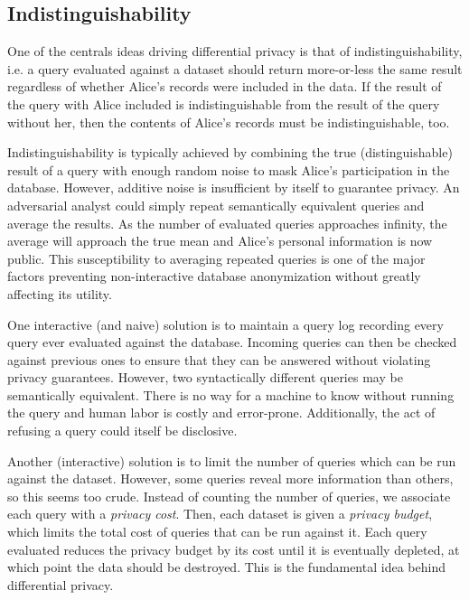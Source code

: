\documentclass[12pt]{report}
\begin{document}
\subsection{Indistinguishability}\label{subsec:intro-indistinguishability}

One of the centrals ideas driving differential privacy is that of indistinguishability, i.e. a query evaluated against a dataset should return more-or-less the same result regardless of whether Alice's records were included in the data.
If the result of the query with Alice included is indistinguishable from the result of the query without her, then the contents of Alice's records must be indistinguishable, too.

Indistinguishability is typically achieved by combining the true (distinguishable) result of a query with enough random noise to mask Alice's participation in the database.
However, additive noise is insufficient by itself to guarantee privacy.
An adversarial analyst could simply repeat semantically equivalent queries and average the results.
As the number of evaluated queries approaches infinity, the average will approach the true mean and Alice's personal information is now public.
This susceptibility to averaging repeated queries is one of the major factors preventing non-interactive database anonymization without greatly affecting its utility.

One interactive (and naive) solution is to maintain a query log recording every query ever evaluated against the database.
Incoming queries can then be checked against previous ones to ensure that they can be answered without violating privacy guarantees.
However, two syntactically different queries may be semantically equivalent.
There is no way for a machine to know without running the query and human labor is costly and error-prone.
Additionally, the act of refusing a query could itself be disclosive.

Another (interactive) solution is to limit the number of queries which can be run against the dataset.
However, some queries reveal more information than others, so this seems too crude.
Instead of counting the number of queries, we associate each query with a \textit{privacy cost}.
Then, each dataset is given a \textit{privacy budget}, which limits the total cost of queries that can be run against it.
Each query evaluated reduces the privacy budget by its cost until it is eventually depleted, at which point the data should be destroyed.
This is the fundamental idea behind differential privacy.
\end{document}
